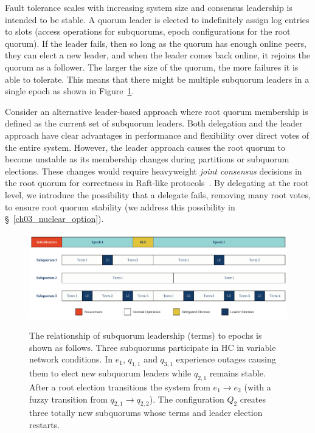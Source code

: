 Fault tolerance scales with increasing system size and consensus leadership is intended to be stable.
A quorum leader is elected to indefinitely assign log entries to slots (access operations for subquorums, epoch configurations for the root quorum).
If the leader fails, then so long as the quorum has enough online peers, they can elect a new leader, and when the leader comes back online, it rejoins the quorum as a follower.
The larger the size of the quorum, the more failures it is able to tolerate.
This means that there might be multiple subquorum leaders in a single epoch as shown in Figure~\ref{fig:ch03_epochs_terms}.

Consider an alternative leader-based approach where root quorum membership is defined as the current set of subquorum leaders.
Both delegation and the leader approach have clear advantages in performance and flexibility over direct votes of the entire system.
However, the leader approach causes the root quorum to become unstable as its membership changes during partitions or subquorum elections.
These changes would require heavyweight \emph{joint consensus} decisions in the root quorum for correctness in Raft-like protocols~\cite{raft}.
By delegating at the root level, we introduce the possibility that a delegate fails, removing many root votes, to ensure root quorum stability (we address this possibility in \S~\ref{ch03_nuclear_option}).


\begin{landscape}
\begin{figure}
    \begin{center}
        \includegraphics[width=8.2in]{figures/ch03_epochs_terms.pdf}
    \end{center}
    \renewcommand{\baselinestretch}{1}
    \small\normalsize

    \begin{quote}
        \caption[Ordering of Epochs and Terms in Root and Subquorums]{The relationship of subquorum leadership (terms) to epochs is shown as follows. Three subquorums participate in HC in variable network conditions. In $e_1$, $q_{1,1}$ and $q_{3,1}$ experience outages causing them to elect new subquorum leaders while $q_{2,1}$ remains stable. After a root election transitions the system from $e_1 \rightarrow e_2$ (with a fuzzy transition from $q_{2,1} \rightarrow q_{2,2}$). The configuration $Q_2$ creates three totally new subquorums whose terms and leader election restarts.}
        \label{fig:ch03_epochs_terms}
    \end{quote}
\end{figure}
\renewcommand{\baselinestretch}{2}
\small\normalsize
\end{landscape}

